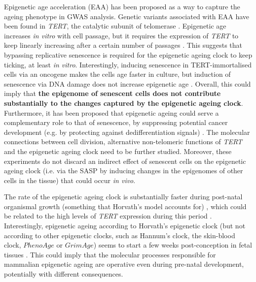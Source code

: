 Epigenetic age acceleration (\acrshort{EAA}) has been proposed as a way to capture the ageing phenotype in GWAS analysis. Genetic variants associated with \acrshort{EAA} have been found in \textit{TERT}, the catalytic subunit of telomerase \citep{Lu2018}. Epigenetic age increases \textit{in vitro} with cell passage, but it requires the expression of \textit{TERT} to keep linearly increasing after a certain number of passages \citep{Lu2018}. This suggests that bypassing replicative senescence is required for the epigenetic ageing clock to keep ticking, at least \textit{in vitro}. Interestingly, inducing senescence in TERT-immortalised cells via an oncogene makes the cells age faster in culture, but induction of senescence via DNA damage does not increase epigenetic age \citep{Lowe2016}. Overall, this could imply that \textbf{the epigenome of senescent cells does not contribute substantially to the changes captured by the epigenetic ageing clock}. Furthermore, it has been proposed that epigenetic ageing could serve a complementary role to that of senescence, by suppressing potential cancer development (e.g. by protecting against dedifferentiation signals) \citep{Horvath2018}. The molecular connections between cell division, alternative non-telomeric functions of \textit{TERT} and the epigenetic ageing clock need to be further studied. Moreover, these experiments do not discard an indirect effect of senescent cells on the epigenetic ageing clock (i.e. via the \acrshort{SASP} by inducing changes in the epigenomes of other cells in the tissue) that could occur \textit{in vivo}. 

\bigskip

The rate of the epigenetic ageing clock is substantially faster during post-natal organismal growth (something that Horvath's model accounts for) \citep{Horvath2013}, which could be related to the high levels of \textit{TERT} expression during this period \citep{Lu2018}. Interestingly, epigenetic ageing according to Horvath's epigenetic clock (but not according to other epigenetic clocks, such as Hannum's clock, the skin-blood clock, $PhenoAge$ or $GrimAge$) seems to start a few weeks post-conception in fetal tissues \citep{Hoshino2019}. This could imply that the molecular processes responsible for mammalian epigenetic ageing are operative even during pre-natal development, potentially with different consequences. 

\bigskip

